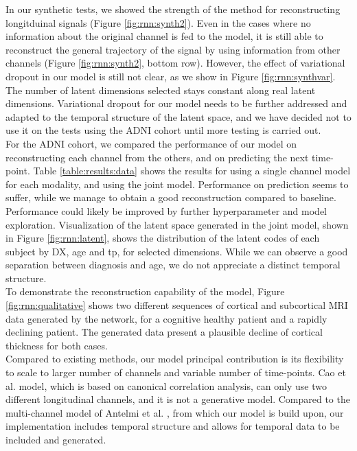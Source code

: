 In our synthetic tests, we showed the strength of the method for reconstructing longitduinal signals (Figure \ref{fig:rnn:synth2}). Even in the cases where no information about the original channel is fed to the model, it is still able to reconstruct the general trajectory of the signal by using information from other channels (Figure \ref{fig:rnn:synth2}, bottom row). However, the effect of variational dropout in our model is still not clear, as we show in Figure \ref{fig:rnn:synthvar}. The number of latent dimensions selected stays constant along real latent dimensions. Variational dropout for our model needs to be further addressed and adapted to the temporal structure of the latent space, and we have decided not to use it on the tests using the ADNI cohort until more testing is carried out.  \\

For the ADNI cohort, we compared the performance of our model on reconstructing each channel from the others, and on predicting the next time-point. Table \ref{table:results:data} shows the results for using a single channel model for each modality, and using the joint model. Performance on prediction seems to suffer, while we manage to obtain a good reconstruction compared to baseline. Performance could likely be improved by further hyperparameter and model exploration. Visualization of the latent space generated in the joint model, shown in Figure \ref{fig:rnn:latent}, shows the distribution of the latent codes of each subject by DX, age and tp, for selected dimensions. While we can observe a good separation between diagnosis and age, we do not appreciate a distinct temporal structure.  \\

To demonstrate the reconstruction capability of the model, Figure \ref{fig:rnn:qualitative} shows two different sequences of cortical and subcortical MRI data generated by the network, for a cognitive healthy patient and a rapidly declining patient. The generated data present a plausible decline of cortical thickness for both cases. \\

Compared to existing methods, our model principal contribution is its flexibility to scale to larger number of channels and variable number of time-points. Cao et al. \cite{Cao2019} model, which is based on canonical correlation analysis, can only use two different longitudinal channels, and it is not a generative model. Compared to the multi-channel model of Antelmi et al. \cite{Antelmi2019}, from which our model is build upon, our implementation includes temporal structure and allows for temporal data to be included and generated. \\

